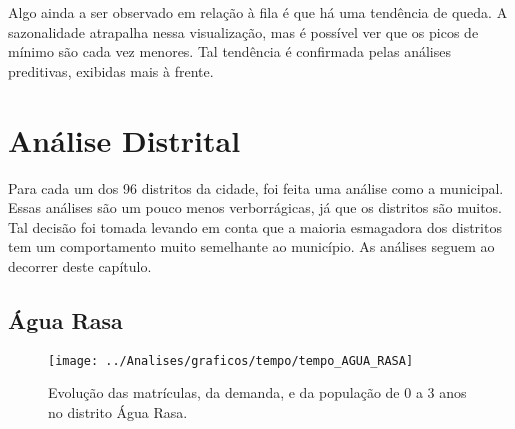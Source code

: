 \documentclass[12pt, a4]{book}
\begin{document}
Algo ainda a ser observado em relação à fila é que há uma tendência de queda. A sazonalidade atrapalha nessa visualização, mas é possível ver que os picos de mínimo são cada vez menores. Tal tendência é confirmada pelas análises preditivas, exibidas mais à frente.

\chapter{Análise Distrital}

Para cada um dos 96 distritos da cidade, foi feita uma análise como a municipal. Essas análises são um pouco menos verborrágicas, já que os distritos são muitos. Tal decisão foi tomada levando em conta que a maioria esmagadora dos distritos tem um comportamento muito semelhante ao município. As análises seguem ao decorrer deste capítulo.

\section{Água Rasa}
			 
\begin{figure}[H]
	\centering
	\texttt{[image: ../Analises/graficos/tempo/tempo\_AGUA\_RASA]}
	\caption{Evolução das matrículas, da demanda, e da população de 0 a 3 anos no distrito Água Rasa.}
	\label{fig:tempoagua-rasa}
\end{figure}
\end{document}
